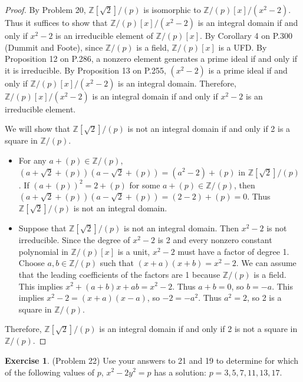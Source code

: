 \documentclass[12pt, psamsfonts]{amsart}
\theoremstyle{definition}
\newtheorem*{exer}{Exercise}
\theoremstyle{remark}
\numberwithin{equation}{section}
\begin{document}
\begin{proof}
  By Problem 20, $\mathbb{Z}[\sqrt{2}]/(p)$ is isomorphic to $\mathbb{Z}/(p)[x]/(x^2 - 2)$.
  Thus it suffices to show that $\mathbb{Z}/(p)[x]/(x^2 - 2)$ is an integral domain if and only if $x^2 - 2$ is an irreducible element of $\mathbb{Z}/(p)[x]$.
  By Corollary 4 on P.300 (Dummit and Foote), since $\mathbb{Z}/(p)$ is a field, $\mathbb{Z}/(p)[x]$ is a UFD.
  By Proposition 12 on P.286, a nonzero element generates a prime ideal if and only if it is irreducible.
  By Proposition 13 on P.255, $(x^2 - 2)$ is a prime ideal if and only if $\mathbb{Z}/(p)[x]/(x^2 - 2)$ is an integral domain.
  Therefore, $\mathbb{Z}/(p)[x]/(x^2 - 2)$ is an integral domain if and only if $x^2 - 2$ is an irreducible element.

  We will show that $\mathbb{Z}[\sqrt{2}]/(p)$ is not an integral domain if and only if 2 is a square in $\mathbb{Z}/(p)$.
  \begin{itemize}
    \item
      For any $a + (p) \in \mathbb{Z}/(p)$, $(a + \sqrt{2} + (p))(a - \sqrt{2} + (p)) = (a^2 - 2) + (p)$ in $\mathbb{Z}[\sqrt{2}]/(p)$.
      If $(a + (p))^2 = 2 + (p)$ for some $a + (p) \in \mathbb{Z}/(p)$, then $(a + \sqrt{2} + (p))(a - \sqrt{2} + (p)) = (2 - 2) + (p) = 0$.
      Thus $\mathbb{Z}[\sqrt{2}]/(p)$ is not an integral domain.
    \item
      Suppose that $\mathbb{Z}[\sqrt{2}]/(p)$ is not an integral domain.
      Then $x^2 - 2$ is not irreducible.
      Since the degree of $x^2 - 2$ is 2 and every nonzero constant polynomial in $\mathbb{Z}/(p)[x]$ is a unit, $x^2 - 2$ must have a factor of degree 1.
      Choose $a, b \in \mathbb{Z}/(p)$ such that $(x + a)(x + b) = x^2 - 2$.
      We can assume that the leading coefficients of the factors are 1 because $\mathbb{Z}/(p)$ is a field.
      This implies $x^2 + (a + b)x + ab = x^2 - 2$.
      Thus $a + b = 0$, so $b = -a$.
      This implies $x^2 - 2 = (x + a)(x - a)$, so $-2 = -a^2$.
      Thus $a^2 = 2$, so 2 is a square in $\mathbb{Z}/(p)$.
  \end{itemize}

  Therefore, $\mathbb{Z}[\sqrt{2}]/(p)$ is an integral domain if and only if 2 is not a square in $\mathbb{Z}/(p)$.
\end{proof}

\begin{exer}{(Problem 22)}
  Use your answers to 21 and 19 to determine for which of the following values of $p$, $x^2 - 2y^2 = p$ has a solution: $p = 3, 5, 7, 11, 13, 17$.
\end{exer}
\end{document}
